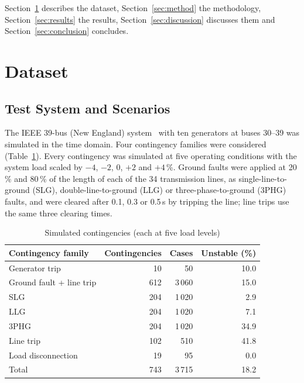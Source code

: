 \documentclass[conference]{IEEEtran}
\begin{document}
Section~\ref{sec:data} describes the dataset, Section~\ref{sec:method} the methodology, Section~\ref{sec:results}
the results, Section~\ref{sec:discussion} discusses them and Section~\ref{sec:conclusion} concludes.

\section{Dataset}
\label{sec:data}
\subsection{Test System and Scenarios}
The IEEE 39-bus (New England) system~\cite{athay1979} with ten generators at buses 30--39 was simulated in the time
domain. %
Four contingency families were considered (Table~\ref{tab:scenarios}). Every contingency was simulated at five
operating conditions with the system load scaled by $-4$, $-2$, 0, $+2$ and $+4$\,\%. Ground faults were applied at
20\,\% and 80\,\% of the length of each of the 34 transmission lines, as single-line-to-ground (SLG),
double-line-to-ground (LLG) or three-phase-to-ground (3PHG) faults, and were cleared after 0.1, 0.3 or 0.5\,s by
tripping the line; line trips use the same three clearing times.

\begin{table}[t]
\caption{Simulated contingencies (each at five load levels)}
\label{tab:scenarios}
\centering
\begin{tabular}{lrrr}
\toprule
Contingency family & Contingencies & Cases & Unstable (\%) \\
\midrule
Generator trip            & 10  & 50     & 10.0 \\
Ground fault + line trip  & 612 & 3\,060 & 15.0 \\
\quad SLG                 & 204 & 1\,020 & 2.9 \\
\quad LLG                 & 204 & 1\,020 & 7.1 \\
\quad 3PHG                & 204 & 1\,020 & 34.9 \\
Line trip                 & 102 & 510    & 41.8 \\
Load disconnection        & 19  & 95     & 0.0 \\
\midrule
Total                     & 743 & 3\,715 & 18.2 \\
\bottomrule
\end{tabular}
\end{table}
\end{document}
